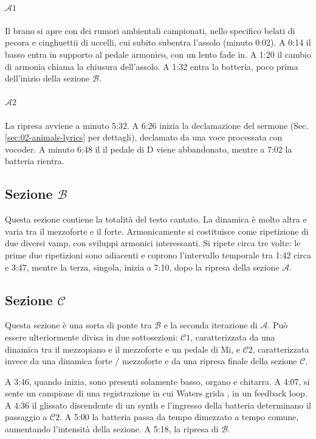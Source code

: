 \documentclass[class=book, crop=false, oneside, 12pt]{standalone}
\begin{document}
    \paragraph{\(\mathcal{A}1\)} 
    Il brano si apre con dei rumori ambientali campionati, nello specifico belati di pecora e cinghuettii di uccelli, cui subito  subentra l'assolo (minuto 0:02). A 0:14 il basso entra in supporto al pedale armonico, con un lento fade in. A 1:20 il cambio di armonia chiama la chiusura dell'assolo. A 1:32 entra la batteria, poco prima dell'inizio della sezione \(\mathcal{B}\).

    \paragraph{\(\mathcal{A}2\)} 
    La ripresa avviene a minuto 5:32. A 6:26 inizia la declamazione del sermone (Sec.\ref{sec:02-animals-lyrics} per dettagli), declamato da una voce processata con vocoder. A minuto 6:48 il il pedale di D viene abbandonato, mentre a 7:02 la batteria rientra.

    \subsection{Sezione \(\mathcal{B}\)}
    Questa sezione contiene la totalità del testo cantato. La dinamica è molto altra e varia tra il mezzoforte e il forte. Armonicamente si costituisce come ripetizione di due diversi vamp, con sviluppi armonici interessanti. Si ripete circa tre volte: le prime due ripetizioni sono adiacenti e coprono l'intervallo temporale tra 1:42 circa e 3:47, mentre la terza, singola,  inizia a 7:10, dopo la ripresa della sezione \(\mathcal{A}\).

    \subsection{Sezione \(\mathcal{C}\)}
    Questa sezione è una sorta di ponte tra \(\mathcal{B}\) e la seconda iterazione di \(\mathcal{A}\). Può essere ulteriormente divisa in due sottosezioni: \(\mathcal{C}1\), caratterizzata da una dinamica tra il mezzopiano e il mezzoforte e un pedale di Mi, e \(\mathcal{C}2\), caratterizzata invece da una dinamica forte / mezzoforte e da una ripresa finale della sezione \(\mathcal{C}\).

    A 3:46, quando inizia, sono presenti solamente basso, organo e chitarra. A 4:07, si sente un campione  di una registrazione in cui Waters grida , in un feedback loop. A 4:36 il glissato discendente di un synth e l'ingresso della batteria determinano il passaggio a \(\mathcal{C}2\). A 5:00 la batteria passa da tempo dimezzato a tempo comune, aumentando l'intensità della sezione. A 5:18, la ripresa di \(\mathcal{B}\).
\end{document}
